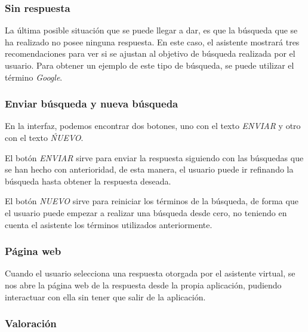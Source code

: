 
\newpage

\subsubsection{Sin respuesta}

La última posible situación que se puede llegar a dar, es que la búsqueda que se ha realizado no posee ninguna respuesta. En este caso, el asistente mostrará tres recomendaciones para ver si se ajustan al objetivo de búsqueda realizada por el usuario. Para obtener un ejemplo de este tipo de búsqueda, se puede utilizar el término \textit{Google}.


\subsubsection{Enviar búsqueda y nueva búsqueda}

En la interfaz, podemos encontrar dos botones, uno con el texto \textit{ENVIAR} y otro con el texto \textit{ŃUEVO}.

El botón \textit{ENVIAR} sirve para enviar la respuesta siguiendo con las búsquedas que se han hecho con anterioridad, de esta manera, el usuario puede ir refinando la búsqueda hasta obtener la respuesta deseada.


El botón \textit{NUEVO} sirve para reiniciar los términos de la búsqueda, de forma que el usuario puede empezar a realizar una búsqueda desde cero, no teniendo en cuenta el asistente los términos utilizados anteriormente.


\subsubsection{Página web}

Cuando el usuario selecciona una respuesta otorgada por el asistente virtual, se nos abre la página web de la respuesta desde la propia aplicación, pudiendo interactuar con ella sin tener que salir de la aplicación.


\subsubsection{Valoración}

